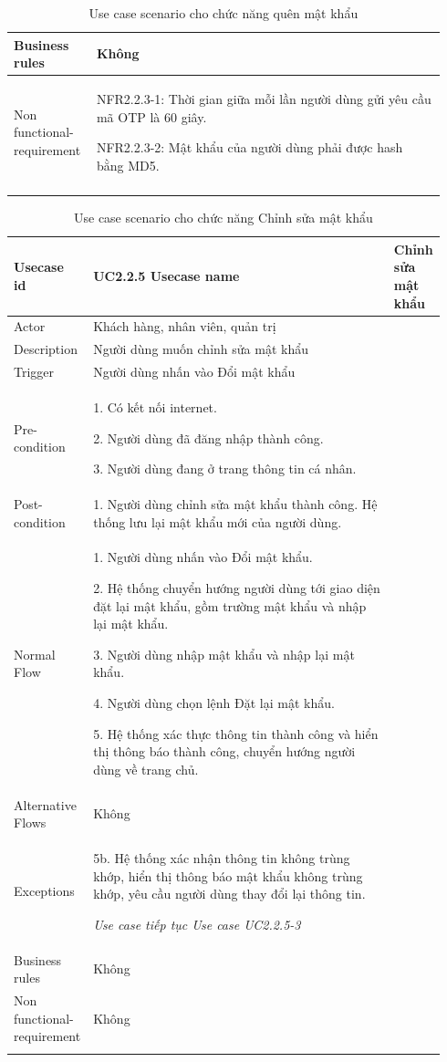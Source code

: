 \begin{longtable}{|>{\hspace{0pt}}m{0.163\linewidth}|>{\hspace{0pt}}m{0.779\linewidth}|}
\hline
Business rules & Không \\ 
\hline
Non functional-requirement & NFR2.2.3-1: Thời gian giữa mỗi lần người dùng gửi yêu cầu mã OTP là 60 giây.\par{}NFR2.2.3-2: Mật khẩu của người dùng phải được hash bằng MD5. \\ 
\hline
\caption{Use case scenario cho chức năng quên mật khẩu}
\end{longtable}

\begin{longtable}{|>{\hspace{0pt}}m{0.169\linewidth}|>{\hspace{0pt}}m{0.773\linewidth}|} 
\hline
Usecase id & UC2.2.5 \endfirsthead 
\hline
Usecase name & Chỉnh sửa mật khẩu \\ 
\hline
Actor & Khách hàng, nhân viên, quản trị \\ 
\hline
Description & Người dùng muốn chỉnh sửa mật khẩu~ \\ 
\hline
Trigger & Người dùng nhấn vào Đổi mật khẩu \\ 
\hline
Pre-condition & 1. Có kết nối internet.\par{}2. Người dùng đã đăng nhập thành công.\par{}3. Người dùng đang ở trang thông tin cá nhân. \\ 
\hline
Post-condition & 1. Người dùng chỉnh sửa mật khẩu thành công. Hệ thống lưu lại mật khẩu mới của người dùng. \\ 
\hline
Normal Flow & 1. Người dùng nhấn vào Đổi mật khẩu.\par{}2. Hệ thống chuyển hướng người dùng tới giao diện đặt lại mật khẩu, gồm trường mật khẩu và nhập lại mật khẩu.\par{}3. Người dùng nhập mật khẩu và nhập lại mật khẩu.\par{}4. Người dùng chọn lệnh Đặt lại mật khẩu.\par{}5. Hệ thống xác thực thông tin thành công và hiển thị thông báo thành công, chuyển hướng người dùng về trang chủ. \\ 
\hline
Alternative Flows & Không \\ 
\hline
Exceptions & 5b. Hệ thống xác nhận thông tin không trùng khớp, hiển thị thông báo mật khẩu không trùng khớp, yêu cầu người dùng thay đổi lại thông tin.\par{}\textit{Use case tiếp tục Use case UC2.2.5-3} \\ 
\hline
Business rules & Không \\ 
\hline
Non functional-requirement & Không \\ 
\hline
\caption{Use case scenario cho chức năng Chỉnh sửa mật khẩu}
\end{longtable}

